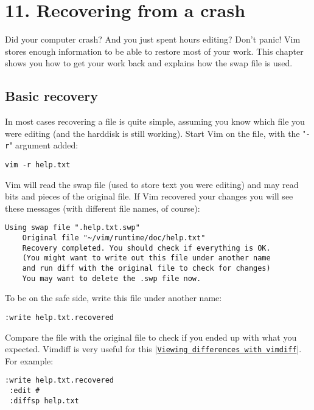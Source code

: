 \section{11. Recovering from a crash}
Did your computer crash?  And you just spent hours editing?  Don't panic!  Vim
stores enough information to be able to restore most of your work.  This
chapter shows you how to get your work back and explains how the swap file is
used.
\subsection{Basic recovery}
In most cases recovering a file is quite simple, assuming you know which file you were editing (and the harddisk is still working).
Start Vim on the file, with the "\texttt{-r}" argument added:

\begin{Verbatim}[samepage=true]
 vim -r help.txt
\end{Verbatim}

Vim will read the swap file (used to store text you were editing) and may read bits and pieces of the original file.
If Vim recovered your changes you will see these messages (with different file names, of course):

\begin{Verbatim}[samepage=true]
    Using swap file ".help.txt.swp" 
    Original file "~/vim/runtime/doc/help.txt" 
    Recovery completed. You should check if everything is OK. 
    (You might want to write out this file under another name 
    and run diff with the original file to check for changes) 
    You may want to delete the .swp file now. 
\end{Verbatim}

To be on the safe side, write this file under another name:

\begin{Verbatim}[samepage=true]
 :write help.txt.recovered
\end{Verbatim}

Compare the file with the original file to check if you ended up with what you expected.
Vimdiff is very useful for this |\hyperref[Viewing differences with vimdiff]{\texttt{Viewing differences with vimdiff}}|.
For example:

\begin{Verbatim}[samepage=true]
 :write help.txt.recovered
 :edit #
 :diffsp help.txt
\end{Verbatim}

